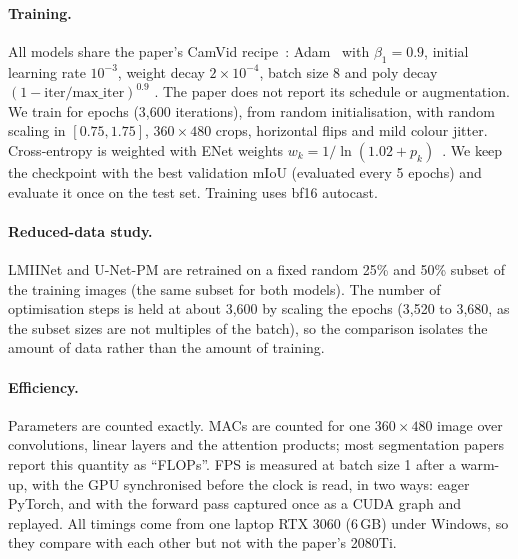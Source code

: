\documentclass{article}
\begin{document}
\paragraph{Training.} All models share the paper's CamVid recipe~\cite{qiu2024lmiinet}:
Adam~\cite{kingma2015adam} with $\beta_1=0.9$, initial learning rate $10^{-3}$, weight decay
$2{\times}10^{-4}$, batch size 8 and poly decay $(1-\text{iter}/\text{max\_iter})^{0.9}$
\cite{chen2018deeplab}. The paper does not report its schedule or augmentation. We train for
\Epochs{} epochs (3,600 iterations), from random initialisation, with random scaling in
$[0.75, 1.75]$, $360{\times}480$ crops, horizontal flips and mild colour jitter. Cross-entropy is
weighted with ENet weights $w_k = 1/\ln(1.02 + p_k)$~\cite{paszke2016enet}. We keep the checkpoint
with the best validation mIoU (evaluated every 5 epochs) and evaluate it once on the test set.
Training uses bf16 autocast.

\paragraph{Reduced-data study.} LMIINet and U-Net-PM are retrained on a fixed random 25\% and
50\% subset of the training images (the same subset for both models). The number of optimisation
steps is held at about 3,600 by scaling the epochs (3,520 to 3,680, as the subset sizes are not
multiples of the batch), so the comparison isolates the amount of data
rather than the amount of training.

\paragraph{Efficiency.} Parameters are counted exactly. MACs are counted for one
$360{\times}480$ image over convolutions, linear layers and the attention products; most
segmentation papers report this quantity as ``FLOPs''. FPS is measured at batch size 1 after a
warm-up, with the GPU synchronised before the clock is read, in two ways: eager PyTorch, and with
the forward pass captured once as a CUDA graph and replayed. All timings come from one laptop
RTX 3060 (6\,GB) under Windows, so they compare with each other but not with the paper's 2080Ti.

\begin{table}[t]
\caption{CamVid test set at $360{\times}480$. FPS at batch 1 on \BenchDevice{}, in eager PyTorch
and as a CUDA-graph replay (fp32 and fp16). The last row is the paper's reported result on an RTX
2080Ti after a longer, unstated schedule (n/r: not reported).}
\label{tab:main}
\centering
\small
\setlength{\tabcolsep}{4pt}
\end{table}
\end{document}
